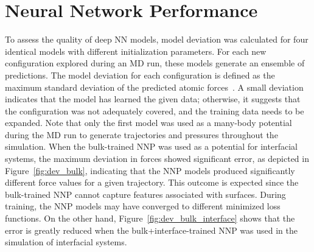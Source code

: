 \section{Neural Network Performance}
To assess the quality of deep NN models, model deviation was calculated for four identical models with different initialization parameters. For each new configuration explored during an MD run, these models generate an ensemble of predictions. The model deviation for each configuration is defined as the maximum standard deviation of the predicted atomic forces~\cite{zhang2019active,zeng2023deepmd}.  A small deviation indicates that the model has learned the given data; otherwise, it suggests that the configuration was not adequately covered, and the training data needs to be expanded. Note that only the first model was used as a many-body potential during the MD run to generate trajectories and pressures throughout the simulation. When the bulk-trained NNP was used as a potential for interfacial systems, the maximum deviation in forces showed significant error, as depicted in Figure~\ref{fig:dev_bulk}, indicating that the NNP models produced significantly different force values for a given trajectory. This outcome is expected since the bulk-trained NNP cannot capture features associated with surfaces. During training, the NNP models may have converged to different minimized loss functions. On the other hand, Figure~\ref{fig:dev_bulk_interface} shows that the error is greatly reduced when the bulk+interface-trained NNP was used in the simulation of interfacial systems.

